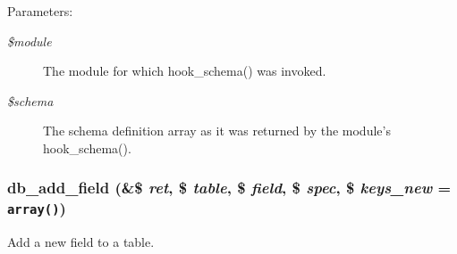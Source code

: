\begin{Desc}
\item[Parameters:]
\begin{description}
\item[{\em \$module}]The module for which hook\_\-schema() was invoked. \item[{\em \$schema}]The schema definition array as it was returned by the module's hook\_\-schema(). \end{description}
\end{Desc}
\hypertarget{group__schemaapi_gdffaa3314b3f50ffd6ba4da381ec78fb}{
\subsubsection[{db\_\-add\_\-field}]{\setlength{\rightskip}{0pt plus 5cm}db\_\-add\_\-field (\&\$ {\em ret}, \/  \$ {\em table}, \/  \$ {\em field}, \/  \$ {\em spec}, \/  \$ {\em keys\_\-new} = {\tt array()})}}
\label{group__schemaapi_gdffaa3314b3f50ffd6ba4da381ec78fb}


Add a new field to a table.

